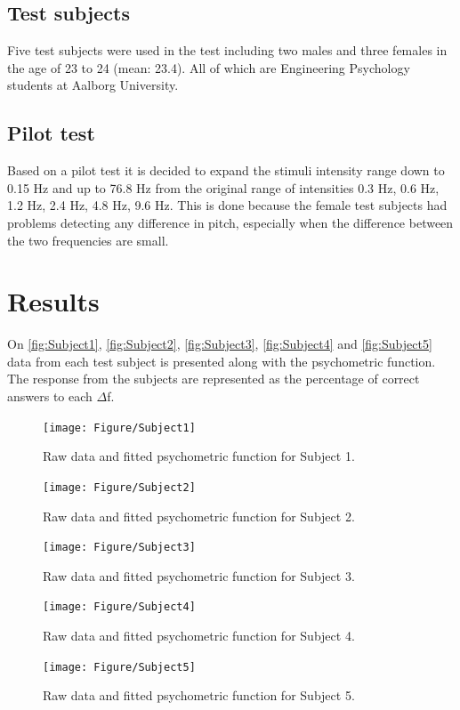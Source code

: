 \subsection*{Test subjects}
%
Five test subjects were used in the test including two males and three females in the age of 23 to 24 (mean: 23.4). All of which are Engineering Psychology students at Aalborg University.

\subsection*{Pilot test}
%
Based on a pilot test it is decided to expand the stimuli intensity range down to 0.15 Hz and up to 76.8 Hz from the original range of intensities 0.3 Hz, 0.6 Hz, 1.2 Hz, 2.4 Hz, 4.8 Hz, 9.6 Hz. This is done because the female test subjects had problems detecting any difference in pitch, especially when the difference between the two frequencies are small.

\section*{Results}
%
On \autoref{fig:Subject1}, \autoref{fig:Subject2}, \autoref{fig:Subject3}, \autoref{fig:Subject4} and \autoref{fig:Subject5} data from each test subject is presented along with the psychometric function. The response from the subjects are represented as the percentage of correct answers to each $\Delta$f.
% 
\begin{figure}[H]
\centering
\texttt{[image: Figure/Subject1]} 
\caption{Raw data and fitted psychometric function for Subject 1.}
\label{fig:Subject1}
\end{figure}
%
\begin{figure}[H]
\centering
\texttt{[image: Figure/Subject2]} 
\caption{Raw data and fitted psychometric function for Subject 2.}
\label{fig:Subject2}
\end{figure}
%
\begin{figure}[H]
\centering
\texttt{[image: Figure/Subject3]} 
\caption{Raw data and fitted psychometric function for Subject 3.}
\label{fig:Subject3}
\end{figure}
%
\begin{figure}[H]
\centering
\texttt{[image: Figure/Subject4]} 
\caption{Raw data and fitted psychometric function for Subject 4.}
\label{fig:Subject4}
\end{figure}
%
\begin{figure}[H]
\centering
\texttt{[image: Figure/Subject5]} 
\caption{Raw data and fitted psychometric function for Subject 5.}
\label{fig:Subject5}
\end{figure}


